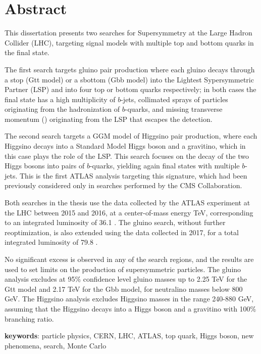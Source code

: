 \chapter*{Abstract}

This dissertation presents two searches for Supersymmetry at the Large Hadron Collider (LHC), targeting signal models with multiple top and bottom quarks in the final state.

The first search targets gluino pair production where each gluino decays through a stop
(Gtt model) or a sbottom (Gbb model) into the Lightest Sypersymmetric Partner (LSP) and into four top or bottom quarks respectively;
in both cases the final state has a high multiplicity of $b$-jets, collimated 
sprays of particles originating from the hadronization of $b$-quarks, and 
missing transverse momentum (\met) originating from the LSP  
that escapes the detection. 

The second search targets a GGM model of Higgsino pair production, 
where each Higgsino decays into a Standard Model Higgs boson and 
a gravitino, which in this case plays the role of the LSP. 
This search focuses on the decay of the two Higgs bosons into pairs of $b$-quarks, yielding again final states with multiple $b$-jets.
This is the first ATLAS analysis targeting this signature, which had been 
previously considered only in searches performed by the CMS Collaboration.

Both searches in the thesis use the data collected by the ATLAS experiment at the LHC 
between 2015 and 2016, at a center-of-mass energy  \cmtre TeV,
corresponding to an integrated luminosity of 36.1 \ifb.
The gluino search, without further reoptimization, is also extended using the data collected in 2017, 
for a total integrated luminosity of 79.8 \ifb.

No significant excess is observed in any of the search regions, 
and the results are used to 
set limits on the production of supersymmetric particles. 
The gluino analysis excludes at 95\% confidence level gluino masses up to 2.25 TeV for the Gtt model 
and 2.17 TeV for the Gbb model, for neutralino masses below 800 GeV.
The Higgsino analysis excludes Higgsino masses in the range 240-880 GeV, assuming 
that the Higgsino decays into a Higgs boson and a gravitino with 100\% branching ratio. 


\textbf{keywords}: particle physics, CERN, LHC, ATLAS, top quark, Higgs boson, new phenomena, search, Monte Carlo